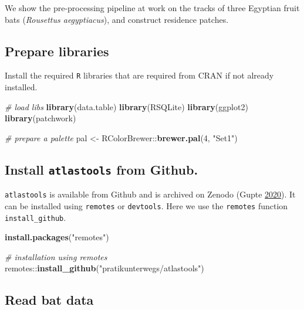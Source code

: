 \documentclass[
]{scrartcl}
\newenvironment{Shaded}{}{}
\newcommand{\CommentTok}[1]{\textcolor[rgb]{0.38,0.63,0.69}{\textit{#1}}}
\newcommand{\DecValTok}[1]{\textcolor[rgb]{0.25,0.63,0.44}{#1}}
\newcommand{\KeywordTok}[1]{\textcolor[rgb]{0.00,0.44,0.13}{\textbf{#1}}}
\newcommand{\NormalTok}[1]{#1}
\newcommand{\OperatorTok}[1]{\textcolor[rgb]{0.40,0.40,0.40}{#1}}
\newcommand{\StringTok}[1]{\textcolor[rgb]{0.25,0.44,0.63}{#1}}
\begin{document}
We show the pre-processing pipeline at work on the tracks of three Egyptian fruit bats (\emph{Rousettus aegyptiacus}), and construct residence patches.

\hypertarget{prepare-libraries}{%
\subsection{Prepare libraries}\label{prepare-libraries}}

Install the required \texttt{R} libraries that are required from CRAN if not already installed.

\begin{Shaded}
\begin{Highlighting}[]
\CommentTok{\# load libs}
\KeywordTok{library}\NormalTok{(data.table)}
\KeywordTok{library}\NormalTok{(RSQLite)}
\KeywordTok{library}\NormalTok{(ggplot2)}
\KeywordTok{library}\NormalTok{(patchwork)}

\CommentTok{\# prepare a palette}
\NormalTok{pal <{-}}\StringTok{ }\NormalTok{RColorBrewer}\OperatorTok{::}\KeywordTok{brewer.pal}\NormalTok{(}\DecValTok{4}\NormalTok{, }\StringTok{"Set1"}\NormalTok{)}
\end{Highlighting}
\end{Shaded}

\hypertarget{install-atlastools-from-github.}{%
\subsection{\texorpdfstring{Install \texttt{atlastools} from Github.}{Install atlastools from Github.}}\label{install-atlastools-from-github.}}

\texttt{atlastools} is available from Github and is archived on Zenodo (Gupte \protect\hyperlink{ref-gupte2020a}{2020}).
It can be installed using \texttt{remotes} or \texttt{devtools}. Here we use the \texttt{remotes} function \texttt{install\_github}.

\begin{Shaded}
\begin{Highlighting}[]
\KeywordTok{install.packages}\NormalTok{(}\StringTok{"remotes"}\NormalTok{)}

\CommentTok{\# installation using remotes}
\NormalTok{remotes}\OperatorTok{::}\KeywordTok{install\_github}\NormalTok{(}\StringTok{"pratikunterwegs/atlastools"}\NormalTok{)}
\end{Highlighting}
\end{Shaded}

\hypertarget{read-bat-data}{%
\subsection{Read bat data}\label{read-bat-data}}
\end{document}
